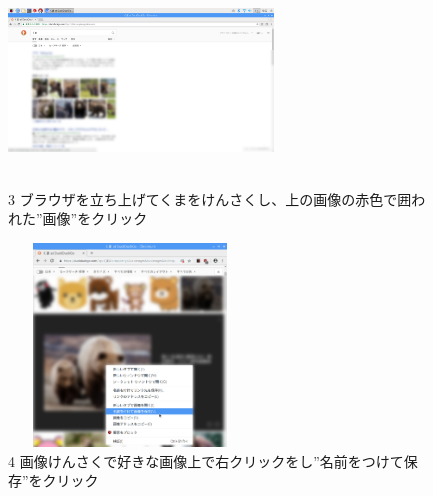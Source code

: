 \documentclass[a4paper,12pt]{jarticle}
\begin{document}
\begin{figure}[t]
	\begin{minipage}{\textwidth}
\begin{minipage}{7.033cm}
\includegraphics[width=7.049cm,height=5.554cm]{textbook-img096.png}\\
3 ブラウザを立ち上げてくまをけんさくし、上の画像の赤色で囲われた”画像”をクリック
\end{minipage}
\begin{minipage}{3.582cm}
\end{minipage}
\begin{minipage}{6.582cm}
\includegraphics[width=6.468cm,height=5.406cm]{textbook-img095.png}\\
4 画像けんさくで好きな画像上で右クリックをし”名前をつけて保存”をクリック
\end{minipage}
	\end{minipage}


\end{figure}
\end{document}
